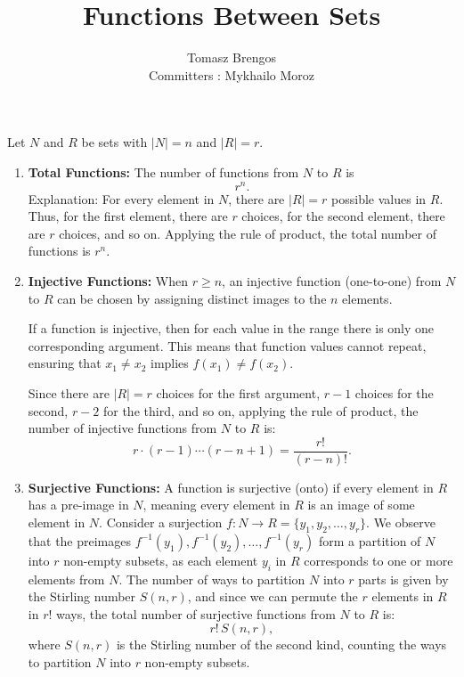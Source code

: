 \documentclass[docmute]{article}
\title{Functions Between Sets}
\author{Tomasz Brengos \\  
Committers : Mykhailo Moroz}
\date{}
\begin{document}
\maketitle
Let $N$ and $R$ be sets with $|N| = n$ and $|R| = r$.

\begin{enumerate}[label=(\roman*)]
    \item \textbf{Total Functions:}  
    The number of functions from \( N \) to \( R \) is  
    \[
    r^n.
    \]  
    Explanation: For every element in \( N \), there are \( |R| = r \) possible values in \( R \). Thus, for the first element, there are \( r \) choices, for the second element, there are \( r \) choices, and so on.  
    Applying the rule of product, the total number of functions is \( r^n \).

    \item \textbf{Injective Functions:}  
    When \( r \geq n \), an injective function (one-to-one) from \( N \) to \( R \) can be chosen by assigning distinct images to the \( n \) elements.  

    If a function is injective, then for each value in the range there is only one corresponding argument. This means that function values cannot repeat, ensuring that \( x_1 \neq x_2 \) implies \( f(x_1) \neq f(x_2) \).  

    Since there are \( |R| = r \) choices for the first argument, \( r-1 \) choices for the second, \( r-2 \) for the third, and so on, applying the rule of product, the number of injective functions from \( N \) to \( R \) is:  
    \[
    r \cdot (r-1) \cdots (r-n+1) = \frac{r!}{(r-n)!}.
    \]
    \item \textbf{Surjective Functions:}  
    A function is surjective (onto) if every element in \( R \) has a pre-image in \( N \), meaning every element in \( R \) is an image of some element in \( N \).  
    Consider a surjection \( f: N \to R = \{y_1, y_2, \dots, y_r\} \). We observe that the preimages \( f^{-1}(y_1), f^{-1}(y_2), \dots, f^{-1}(y_r) \) form a partition of \( N \) into \( r \) non-empty subsets, as each element \( y_i \) in \( R \) corresponds to one or more elements from \( N \).  
    The number of ways to partition \( N \) into \( r \) parts is given by the Stirling number \( S(n, r) \), and since we can permute the \( r \) elements in \( R \) in \( r! \) ways, the total number of surjective functions from \( N \) to \( R \) is:  
    \[
    r! \, S(n, r),
    \]
    where \( S(n, r) \) is the Stirling number of the second kind, counting the ways to partition \( N \) into \( r \) non-empty subsets.

\end{enumerate}
\end{document}

